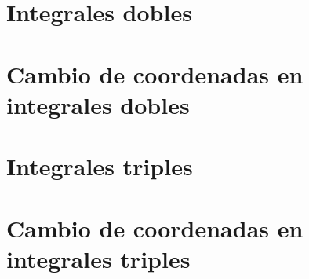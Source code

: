 \documentclass[../main]{subfiles}
\begin{document}
\chapter{Integrales dobles}

\chapter{Cambio de coordenadas en integrales dobles}

\chapter{Integrales triples}

\chapter{Cambio de coordenadas en integrales triples}
\end{document}
